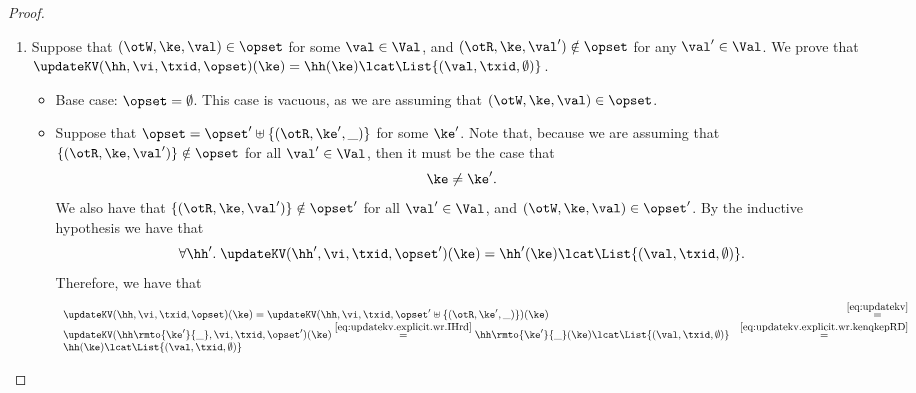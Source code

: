 \begin{proof}
\begin{enumerate}
	\item Suppose that $(\otW, \ke, \val) \in \opset$ for some $\val \in \Val$, and 
	$(\otR, \ke, \val') \notin \opset$ for any $\val' \in \Val$. We prove that 
	$\updateKV(\hh, \vi, \txid, \opset)(\ke) = \hh(\ke) \lcat \List{(\val, \txid, \emptyset)}$. 
		\begin{itemize}
		\item Base case: $\opset = \emptyset$. This case is vacuous, as we are assuming 
		that $(\otW, \ke, \val) \in \opset$.
		\item Suppose that $\opset = \opset' \uplus \{(\otR, \ke', \_)\}$ for some 
		$\ke'$. Note that, because we are assuming that $\{(\otR, \ke, \val')\} \notin \opset$ 
		for all $\val' \in \Val$, then it must be the case that 
		\begin{equation}
		\ke \neq \ke'.
		\label{eq:updatekv.explicit.wr.kenqkepRD}
		\end{equation}	
		We also have that $\{(\otR, \ke, \val')\} \notin \opset'$ for all $\val' \in \Val$, and 
		$(\otW, \ke, \val) \in \opset'$. By the inductive hypothesis we have that 
		\begin{equation}
		\forall \hh'.\; \updateKV(\hh', \vi, \txid, \opset')(\ke) = \hh'(\ke) \lcat \List{(\val, \txid, \emptyset)}.
		\label{eq:updatekv.explicit.wr.IHrd}
		\end{equation}
		Therefore, we have that 
		\[
		\begin{array}{lr}
		\updateKV(\hh, \vi, \txid, \opset)(\ke) = \updateKV(\hh, \vi, \txid, \opset' \uplus \{(\otR, \ke', \_)\})(\ke) &\stackrel{\eqref{eq:updatekv}}{=}\\
		\updateKV(\hh\rmto{\ke'}{\_}, \vi ,\txid, \opset')(\ke) \stackrel{\eqref{eq:updatekv.explicit.wr.IHrd}}{=} \hh\rmto{\ke'}{\_}(\ke) \lcat \List{(\val, \txid, \emptyset)} 
		& \stackrel{\eqref{eq:updatekv.explicit.wr.kenqkepRD}}{=} \\
		\hh(\ke) \lcat \List{(\val, \txid, \emptyset)}
		\end{array}
		\]
		

\end{itemize}
\end{enumerate}
\end{proof}

